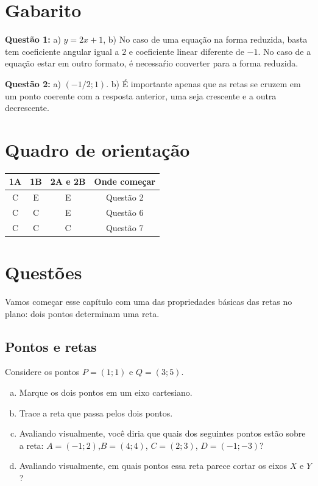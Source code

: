 \documentclass[main.tex]{subfiles}
\begin{document}
\paraTutores

\section{Gabarito}

\textbf{Questão 1:} a) $y=2x+1$, b) No caso de uma equação na forma reduzida, basta tem coeficiente angular igual a $2$ e coeficiente linear diferente de $-1$. No caso de a equação estar em outro formato, é necessaŕio converter para a forma reduzida.

\textbf{Questão 2:} a) $(-1/2;1)$. b) É importante apenas que as retas se cruzem em um ponto coerente com a resposta anterior, uma seja crescente e a outra decrescente.

\section{Quadro de orientação}

\begin{center}
 \begin{tabular}{|c c c |c|} 
 \hline
 1A & 1B & 2A e 2B & Onde começar\\
 \hline
 C & E & E & Questão 2 \\ 
 \hline
 C & C & E & Questão 6 \\ 
 \hline
 C & C & C & Questão 7 \\ 
 \hline
\end{tabular}
\end{center}

\paraAmbos

\newpage

\section{Questões}

Vamos começar esse capítulo com uma das propriedades básicas das retas no plano: dois pontos determinam uma reta.

\subsection*{Pontos e retas}

\begin{questao}
Considere os pontos $P=(1;1)$ e $Q=(3;5)$.
\begin{enumerate}[a)]
\item Marque os dois pontos em um eixo cartesiano.
\item Trace a reta que passa pelos dois pontos.
\item Avaliando visualmente, você diria que quais dos seguintes pontos estão sobre a reta: $A=(-1;2)$,$B=(4;4)$, $C=(2;3)$, $D=(-1;-3)$?
\item Avaliando visualmente, em quais pontos essa reta parece cortar os eixos $X$ e $Y$?
\end{enumerate}
\end{questao}
\end{document}
